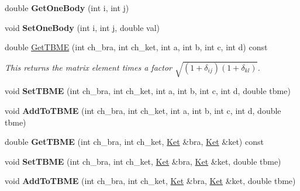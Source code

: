 \begin{DoxyCompactItemize}
\item 
\hypertarget{classOperator_a34eb5fa0e6d415cd44e1a3034d1cf5c0}{double {\bfseries Get\-One\-Body} (int i, int j)}\label{classOperator_a34eb5fa0e6d415cd44e1a3034d1cf5c0}

\item 
\hypertarget{classOperator_ae85aa3d8fdaeb3cb6266c3a4494e904b}{void {\bfseries Set\-One\-Body} (int i, int j, double val)}\label{classOperator_ae85aa3d8fdaeb3cb6266c3a4494e904b}

\item 
\hypertarget{classOperator_aaa072b887da84ca14a4968df17ea8812}{double \hyperlink{classOperator_aaa072b887da84ca14a4968df17ea8812}{Get\-T\-B\-M\-E} (int ch\-\_\-bra, int ch\-\_\-ket, int a, int b, int c, int d) const }\label{classOperator_aaa072b887da84ca14a4968df17ea8812}

\begin{DoxyCompactList}\small\item\em This returns the matrix element times a factor $ \sqrt{(1+\delta_{ij})(1+\delta_{kl})} $. \end{DoxyCompactList}\item 
\hypertarget{classOperator_aee848be1803687e81732c068cb189d46}{void {\bfseries Set\-T\-B\-M\-E} (int ch\-\_\-bra, int ch\-\_\-ket, int a, int b, int c, int d, double tbme)}\label{classOperator_aee848be1803687e81732c068cb189d46}

\item 
\hypertarget{classOperator_a550f0ee9142a0f3e01d9802ebdb1c77f}{void {\bfseries Add\-To\-T\-B\-M\-E} (int ch\-\_\-bra, int ch\-\_\-ket, int a, int b, int c, int d, double tbme)}\label{classOperator_a550f0ee9142a0f3e01d9802ebdb1c77f}

\item 
\hypertarget{classOperator_ac80e23706e883b9815f8e499aafe1887}{double {\bfseries Get\-T\-B\-M\-E} (int ch\-\_\-bra, int ch\-\_\-ket, \hyperlink{classKet}{Ket} \&bra, \hyperlink{classKet}{Ket} \&ket) const }\label{classOperator_ac80e23706e883b9815f8e499aafe1887}

\item 
\hypertarget{classOperator_a2f4c2afcd73548b13131b4b77ddd7e30}{void {\bfseries Set\-T\-B\-M\-E} (int ch\-\_\-bra, int ch\-\_\-ket, \hyperlink{classKet}{Ket} \&bra, \hyperlink{classKet}{Ket} \&ket, double tbme)}\label{classOperator_a2f4c2afcd73548b13131b4b77ddd7e30}

\item 
\hypertarget{classOperator_a874934e8d43292a7c91ba7aac2eebb04}{void {\bfseries Add\-To\-T\-B\-M\-E} (int ch\-\_\-bra, int ch\-\_\-ket, \hyperlink{classKet}{Ket} \&bra, \hyperlink{classKet}{Ket} \&ket, double tbme)}\label{classOperator_a874934e8d43292a7c91ba7aac2eebb04}


\end{DoxyCompactItemize}
